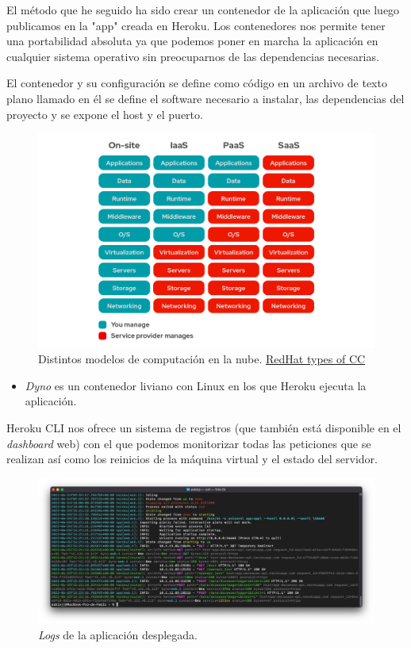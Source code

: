 El método que he seguido ha sido crear un contenedor de la aplicación que luego publicamos en la "app" creada en Heroku. Los contenedores nos permite tener una portabilidad absoluta ya que podemos poner en marcha la aplicación en cualquier sistema operativo sin preocuparnos de las dependencias necesarias.

El contenedor y su configuración se define como código en un archivo de texto plano llamado  en él se define el software necesario a instalar, las dependencias del proyecto y se expone el host y el puerto.

\FloatBarrier
\begin{figure}[h]
	\centering	
	\includegraphics[width=\textwidth]{doc/logos/imgs/iaas-paas.png}
	\caption{ Distintos modelos de computación en la nube. \href{https://www.redhat.com/es/topics/cloud-computing/iaas-vs-paas-vs-saas#paas}{RedHat types of CC}}
    \label{fig:tipos-de-cc}
\end{figure}
\FloatBarrier

\begin{itemize}
    \item \textit{Dyno} es un contenedor liviano con Linux en los que Heroku ejecuta la aplicación.
\end{itemize}

Heroku CLI nos ofrece un sistema de registros (que también está disponible en el \textit{dashboard} web) con el que podemos monitorizar todas las peticiones que se realizan así como los reinicios de la máquina virtual y el estado del servidor.

\FloatBarrier
\begin{figure}[h]
	\centering	
	\includegraphics[width=\textwidth]{doc/logos/imgs/logs.jpg}
	\caption{ \textit{Logs} de la aplicación desplegada. }
    \label{fig:heroku-logs}
\end{figure}
\FloatBarrier

